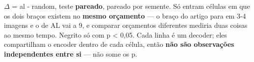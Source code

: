 \footnotesize $\Delta$ = al - random, teste \textbf{pareado}, pareado por semente. Só entram células em que os dois braços existem no \textbf{mesmo orçamento} --- o braço do artigo para em 3-4 imagens e o de AL vai a 9, e comparar orçamentos diferentes mediria duas coisas ao mesmo tempo. Negrito só com p < 0,05. Cada linha é um decoder; eles compartilham o encoder dentro de cada célula, então \textbf{não são observações independentes entre si} --- não some os p.
\normalsize
